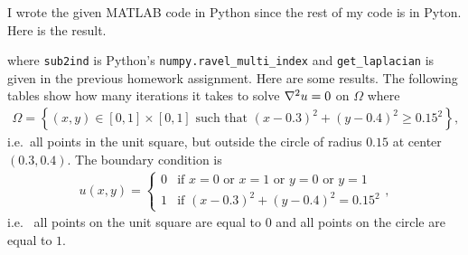 \documentclass{article} %
\theoremstyle{plain}
\numberwithin{equation}{section} %
\numberwithin{figure}{section} %
\numberwithin{table}{section} %
\begin{document}
I wrote the given MATLAB code in Python since the rest of my code is in Pyton.  Here is the result.

where \texttt{sub2ind} is Python's \texttt{numpy.ravel\_multi\_index} and \texttt{get\_laplacian} is given in the previous homework assignment.  Here are some results.  The following tables show how many iterations it takes to solve $\laplacian u = 0$ on $\Omega$ where
\begin{align*}
     \Omega = \left\{(x,y) \in [0,1]\times[0,1] \text{ such that } (x - 0.3)^2 + (y - 0.4)^2 \geq 0.15^2\right\},
\end{align*}
i.e.~all points in the unit square, but outside the circle of radius $0.15$ at center $(0.3,0.4)$.  The boundary condition is
\begin{align*}
    u(x,y) = \begin{cases}
      0 & \text{if } x = 0 \text{ or } x = 1 \text{ or } y = 0 \text{ or } y = 1 \\
      1 & \text{if } (x - 0.3)^2 + (y - 0.4)^2 = 0.15^2
    \end{cases},
\end{align*}
i.e.~ all points on the unit square are equal to $0$ and all points on the circle are equal to $1$.
\end{document}
